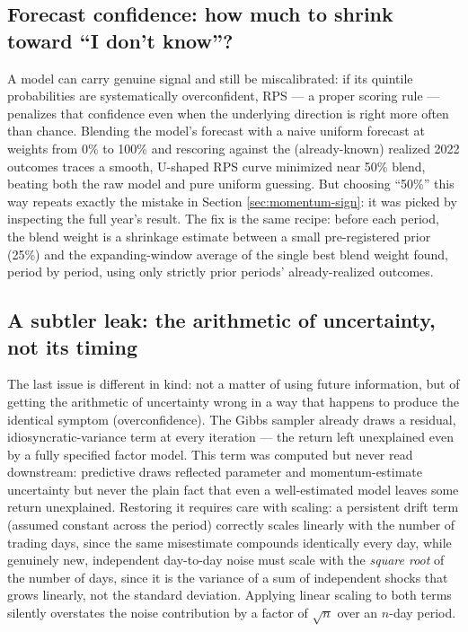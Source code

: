 \documentclass[11pt]{article}
\begin{document}
\subsection{Forecast confidence: how much to shrink toward ``I don't know''?}
\label{sec:shrinkage}
A model can carry genuine signal and still be miscalibrated: if its
quintile probabilities are systematically overconfident, RPS --- a proper
scoring rule --- penalizes that confidence even when the underlying
direction is right more often than chance. Blending the model's forecast
with a naive uniform forecast at weights from 0\% to 100\% and rescoring
against the (already-known) realized 2022 outcomes traces a smooth,
U-shaped RPS curve minimized near 50\% blend, beating both the raw model
and pure uniform guessing. But choosing ``50\%'' this way repeats
exactly the mistake in Section \ref{sec:momentum-sign}: it was picked by
inspecting the full year's result. The fix is the same recipe: before
each period, the blend weight is a shrinkage estimate between a small
pre-registered prior (25\%) and the expanding-window average of the
single best blend weight found, period by period, using only strictly
prior periods' already-realized outcomes.

\subsection{A subtler leak: the arithmetic of uncertainty, not its timing}
\label{sec:residual-noise}
The last issue is different in kind: not a matter of using future
information, but of getting the arithmetic of uncertainty wrong in a way
that happens to produce the identical symptom (overconfidence). The
Gibbs sampler already draws a residual, idiosyncratic-variance term at
every iteration --- the return left unexplained even by a fully specified
factor model. This term was computed but never read downstream:
predictive draws reflected parameter and momentum-estimate uncertainty
but never the plain fact that even a well-estimated model leaves some
return unexplained. Restoring it requires care with scaling: a
persistent drift term (assumed constant across the period) correctly
scales linearly with the number of trading days, since the same
misestimate compounds identically every day, while genuinely new,
independent day-to-day noise must scale with the \emph{square root} of
the number of days, since it is the variance of a sum of independent
shocks that grows linearly, not the standard deviation. Applying linear
scaling to both terms silently overstates the noise contribution by a
factor of $\sqrt{n}$ over an $n$-day period.
\end{document}
